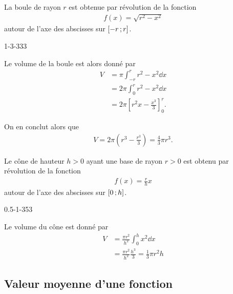 \documentclass[main.tex]{subfiles}
\begin{document}
\begin{example}

    La boule de rayon $r$ est obtenue par révolution de la fonction
    \begin{align}
        f(x) = \sqrt {r^2 - x^2}
    \end{align}
    autour de l'axe des abscisses sur $\mathopen{[}-r\,;r\mathclose{]}$.
    \begin{plot}
        {1}{-3}{-3}{3}{3}
    \end{plot}

    Le volume de la boule est alors donné par
    \begin{align}
        V &= \pi \int_{-r}^r r^2 - x^2 \dd x\\
          &= 2 \pi \int_0^r r^2 - x^2 \dd x\\
          &= 2 \pi \left[r^2 x - \frac {x^3} 3\right]^r_0.
    \end{align}

    On en conclut alors que
    \begin{align}
        V = 2 \pi \left(r^3 - \frac {r^3} 3\right) = \frac 4 3 \pi r^3.
    \end{align}
\end{example}

\begin{example}

    Le cône de hauteur $h > 0$ ayant une base de rayon $r > 0$ est obtenu par révolution de la fonction
    \begin{align}
        f(x) = \frac r h x
    \end{align}
    autour de l'axe des abscisses sur $\mathopen{[}0\,;h\mathclose{]}$.
    \begin{plot}
        {0.5}{-1}{-3}{5}{3}
    \end{plot}

    Le volume du cône est donné par
    \begin{align}
        V
        &= \frac {\pi r^2} {h^2} \int_0^h x^2 \dd x\\
        &= \frac {\pi r^2} {h^2} \frac {h^3} 3
        = \frac 1 3 \pi r^2 h
    \end{align}
\end{example}

\subsection{Valeur moyenne d'une fonction}
\end{document}
